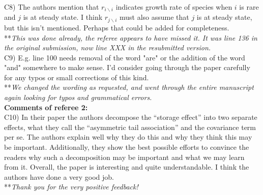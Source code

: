 \documentclass[letterpaper,11pt]{article}
\newcommand{\bs}{\backslash}
\begin{document}
\noindent C8) The authors mention that $r_{i \bs i}$ indicates growth rate of species when $i$ is rare and $j$ is at steady state.  I think $r_{j \bs i}$ must also assume that $j$ is at steady state, but this isn't mentioned. Perhaps that could be added for completeness. \\

\noindent ***\emph{This was done already, the referee appears to have missed it. It was line 136 in the original submission,
now line XXX in the resubmitted version.} \\

\noindent C9) E.g. line 100 needs removal of the word "are" or the addition of the word "and" somewhere to make sense. I'd consider going through the paper carefully for any typos or small corrections of this kind. \\

\noindent ***\emph{We changed the wording as requested, and went through the entire manuscript again looking for typos
and grammatical errors.} \\

\noindent \textbf{Comments of referee 2:} \\

\noindent C10) In their paper the authors decompose the “storage effect” into two separate effects, what they call the “asymmetric tail association” and the covariance term per se. The authors explain well why they do this and why they think this may be important. Additionally, they show the best possible efforts to convince the readers why such a decomposition may be important and what we may learn from it. Overall, the paper is interesting and quite understandable. I think the authors have done a very good job. \\

\noindent ***\emph{Thank you for the very positive feedback!} \\
\end{document}
